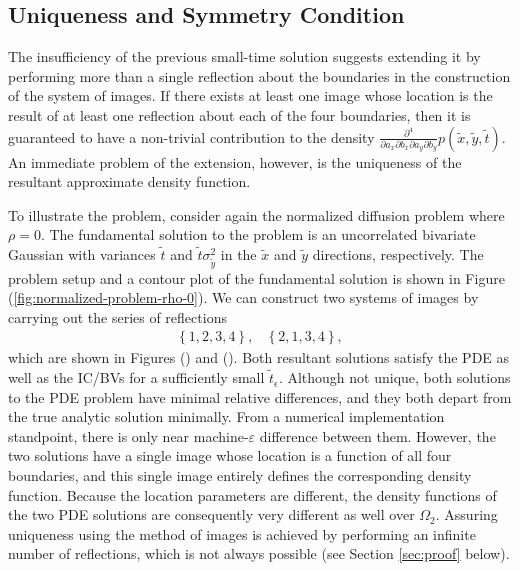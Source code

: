 \subsection{Uniqueness and Symmetry Condition}
The insufficiency of the previous small-time solution suggests
extending it by performing more than a single reflection about the
boundaries in the construction of the system of images. If there
exists at least one image whose location is the result of at least one
reflection about each of the four boundaries, then it is guaranteed to
have a non-trivial contribution to the density
$\frac{\partial^4}{\partial a_x \partial b_x \partial a_y \partial
  b_y} p(\tilde{x}, \tilde{y}, \tilde{t})$. An immediate problem of
the extension, however, is the uniqueness of the resultant approximate
density function.

To illustrate the problem, consider again the normalized diffusion
problem where $\rho=0$. The fundamental solution to the problem is an
uncorrelated bivariate Gaussian with variances $\tilde{t}$ and
$\tilde{t}\sigma_{\tilde{y}}^2$ in the $\tilde{x}$ and $\tilde{y}$
directions, respectively. The problem setup and a contour plot of the
fundamental solution is shown in Figure
(\ref{fig:normalized-problem-rho-0}). We can construct two systems of
images by carrying out the series of reflections
\begin{align*}
  & \left\{ 1,2,3,4 \right\}, & \left\{ 2,1,3,4 \right\}, &
\end{align*}
which are shown in Figures () and (). Both resultant solutions satisfy
the PDE as well as the IC/BVs for a sufficiently small
$\tilde{t}_\epsilon$. Although not unique, both solutions to the PDE
problem have minimal relative differences, and they both depart from
the true analytic solution minimally. From a numerical implementation
standpoint, there is only near machine-$\varepsilon$ difference
between them. However, the two solutions have a single image whose
location is a function of all four boundaries, and this single image
entirely defines the corresponding density function. Because the
location parameters are different, the density functions of the two
PDE solutions are consequently very different as well over
$\Omega_2$. Assuring uniqueness using the method of images is achieved
by performing an infinite number of reflections, which is not always
possible (see Section \ref{sec:proof} below).

